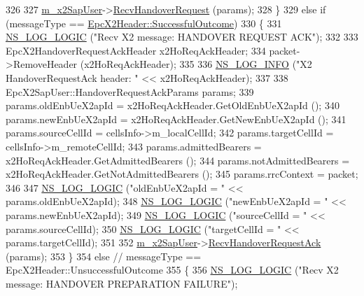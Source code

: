\begin{DoxyCode}
326 
327           \hyperlink{classns3_1_1EpcX2_a0a74a3c19067fe18af3021c7b4c24c19}{m\_x2SapUser}->\hyperlink{classns3_1_1EpcX2SapUser_ac89cf3449fc971960e4c7a7a9af23c7d}{RecvHandoverRequest} (params);
328         \}
329       \textcolor{keywordflow}{else} \textcolor{keywordflow}{if} (messageType == \hyperlink{classns3_1_1EpcX2Header_a0e69b043a20eaee4c570f223f4eca715a21bd7a420a07fd4849d7271a5c381a44}{EpcX2Header::SuccessfulOutcome})
330         \{
331           \hyperlink{group__logging_ga88acd260151caf2db9c0fc84997f45ce}{NS\_LOG\_LOGIC} (\textcolor{stringliteral}{"Recv X2 message: HANDOVER REQUEST ACK"});
332 
333           EpcX2HandoverRequestAckHeader x2HoReqAckHeader;
334           packet->RemoveHeader (x2HoReqAckHeader);
335 
336           \hyperlink{group__logging_gafbd73ee2cf9f26b319f49086d8e860fb}{NS\_LOG\_INFO} (\textcolor{stringliteral}{"X2 HandoverRequestAck header: "} << x2HoReqAckHeader);
337 
338           EpcX2SapUser::HandoverRequestAckParams params;          
339           params.oldEnbUeX2apId = x2HoReqAckHeader.GetOldEnbUeX2apId ();
340           params.newEnbUeX2apId = x2HoReqAckHeader.GetNewEnbUeX2apId ();
341           params.sourceCellId   = cellsInfo->m\_localCellId;
342           params.targetCellId   = cellsInfo->m\_remoteCellId;
343           params.admittedBearers = x2HoReqAckHeader.GetAdmittedBearers ();
344           params.notAdmittedBearers = x2HoReqAckHeader.GetNotAdmittedBearers ();
345           params.rrcContext     = packet;
346 
347           \hyperlink{group__logging_ga88acd260151caf2db9c0fc84997f45ce}{NS\_LOG\_LOGIC} (\textcolor{stringliteral}{"oldEnbUeX2apId = "} << params.oldEnbUeX2apId);
348           \hyperlink{group__logging_ga88acd260151caf2db9c0fc84997f45ce}{NS\_LOG\_LOGIC} (\textcolor{stringliteral}{"newEnbUeX2apId = "} << params.newEnbUeX2apId);
349           \hyperlink{group__logging_ga88acd260151caf2db9c0fc84997f45ce}{NS\_LOG\_LOGIC} (\textcolor{stringliteral}{"sourceCellId = "} << params.sourceCellId);
350           \hyperlink{group__logging_ga88acd260151caf2db9c0fc84997f45ce}{NS\_LOG\_LOGIC} (\textcolor{stringliteral}{"targetCellId = "} << params.targetCellId);
351 
352           \hyperlink{classns3_1_1EpcX2_a0a74a3c19067fe18af3021c7b4c24c19}{m\_x2SapUser}->\hyperlink{classns3_1_1EpcX2SapUser_a5e390d132f3f8433838aec1719a52bc2}{RecvHandoverRequestAck} (params);
353         \}
354       \textcolor{keywordflow}{else} \textcolor{comment}{// messageType == EpcX2Header::UnsuccessfulOutcome}
355         \{
356           \hyperlink{group__logging_ga88acd260151caf2db9c0fc84997f45ce}{NS\_LOG\_LOGIC} (\textcolor{stringliteral}{"Recv X2 message: HANDOVER PREPARATION FAILURE"});

\end{DoxyCode}
